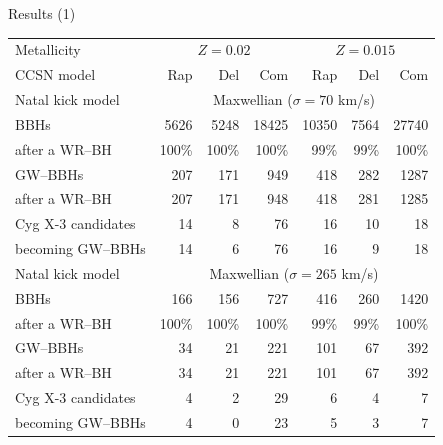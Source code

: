 \documentclass{beamer} %
\begin{document}
\begin{frame}[noframenumbering]{Results (1)}
	\scriptsize
	\begin{tabular}{l rrr>{\hspace{1.5pc}}rrr}
		\toprule
		Metallicity & \multicolumn{3}{c}{$Z=0.02$} & \multicolumn{3}{c}{$Z=0.015$}  \\
		CCSN model & Rap & Del & Com &  Rap & Del & Com\\
		\toprule
		\toprule
		Natal kick model & \multicolumn{6}{c}{Maxwellian ($\sigma{}=70$ km/s)}
		\\
		\toprule
		BBHs  		                    & 5626 & 5248 & 18425 & 10350 & 7564 & 27740 \\
		after a WR--BH			& 100\% & 100\% & 100\% & 99\% & 99\%& 100\% \\
		\hline
		GW--BBHs  						& 207 & 171 & 949 & 418 & 282 & 1287 \\
		after a WR--BH				& 207 & 171 & 948 & 418 & 281 & 1285 \\
		\hline
		Cyg X-3 candidates 	 		& 14 & 8 & 76 & 16 & 10 & 18 \\
		becoming GW--BBHs   			& 14 & 6 & 76 & 16 & 9 & 18 \\
		\bottomrule 	
		\toprule
		Natal kick model & \multicolumn{6}{c}{Maxwellian ($\sigma{}=265$ km/s)}\\
		\toprule
		BBHs                        & 166 & 156 & 727  & 416 & 260 & 1420 \\
		after a WR--BH	  & 100\% & 100\% &  100\% & 99\% & 99\%&  100\% \\
		\hline
		GW--BBHs  		          & 34 & 21 & 221 & 101 & 67 &  392\\
		after a WR--BH	  & 34 & 21 &  221& 101 & 67 &  392\\
		\hline
		Cyg X-3 candidates  	  & 4 & 2 & 29 & 6 & 4 &  7\\
		becoming GW--BBHs   	  & 4 & 0 & 23 & 5 & 3 & 7 \\
		\bottomrule 	
	\end{tabular}%
\end{frame}
\end{document}
